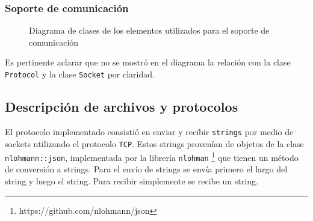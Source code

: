 \documentclass[a4paper]{article}
\begin{document}
\subsubsection{Soporte de comunicación}

\begin{figure}[!h]
	\caption{Diagrama de clases de los elementos utilizados para el soporte de comunicación}
	\label{fig:diagrama5}
\end{figure}

Es pertinente aclarar que no se mostró en el diagrama la relación con la clase \texttt{Protocol} y la clase \texttt{Socket} por claridad.
\newpage

\subsection{Descripción de archivos y protocolos}

El protocolo implementado consistió en enviar y recibir \texttt{strings} por medio de sockets utilizando el protocolo \texttt{TCP}. Estos strings provenían de objetos de la clase \texttt{nlohmann::json}, implementada por la librería \texttt{nlohman} \footnote{https://github.com/nlohmann/json} que tienen un método de conversión a strings. Para el envío de strings se envía primero el largo del string y luego el string. Para recibir simplemente se recibe un string.
\end{document}

